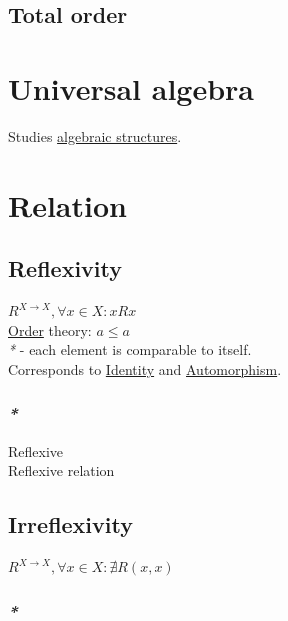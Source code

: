 \documentclass[a4paper,14pt,oneside]{book}
\begin{document}
{\section{\label{org8783e56}Total order}
\label{sec:orgfe97e65}

\chapter{\label{org55cd0bb}Universal algebra}
\label{sec:org1843235}

Studies \hyperref[org344f79b]{algebraic structures}.\\

\chapter{\label{org133f364}Relation}
\label{sec:orgc9a3fb9}

\section{\label{orgf2876f0}Reflexivity}
\label{sec:orgabf07a7}

\(R^{X \to X}, \forall x \in X : x R x\)\\
\hyperref[orgb3255b0]{Order} theory: \(a \le a\)\\

\emph{*} - each element is comparable to itself.\\

Corresponds to \hyperref[org4f76d7c]{Identity} and \hyperref[orgf43d83a]{Automorphism}.\\

\subsection{\emph{*}}
\label{sec:org65a738f}

\label{orgabc6f82}Reflexive\\
\label{org0e46186}Reflexive relation\\

\section{\label{orgfc7a553}Irreflexivity}
\label{sec:org8d7664d}

\(R^{X \to X}, \forall x \in X : \nexists R(x, x)\)\\

\subsection{\emph{*}}
\label{sec:org1833b1d}

}
\end{document}
